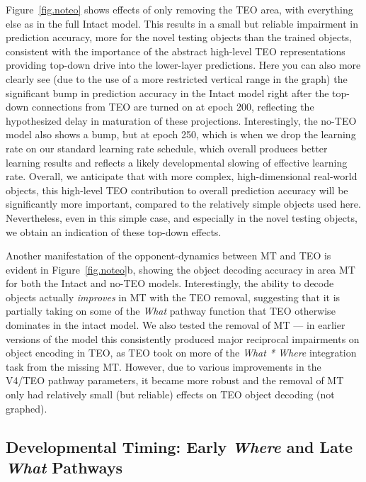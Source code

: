 \documentclass[11pt,twoside]{article}
\newif\myifpdf
\begin{document}
Figure~\ref{fig.noteo} shows effects of only removing the TEO area, with everything else as in the full Intact model.  This results in a small but reliable impairment in prediction accuracy, more for the novel testing objects than the trained objects, consistent with the importance of the abstract high-level TEO representations providing top-down drive into the lower-layer predictions.  Here you can also more clearly see (due to the use of a more restricted vertical range in the graph) the significant bump in prediction accuracy in the Intact model right after the top-down connections from TEO are turned on at epoch 200, reflecting the hypothesized delay in maturation of these projections.  Interestingly, the no-TEO model also shows a bump, but at epoch 250, which is when we drop the learning rate on our standard learning rate schedule, which overall produces better learning results and reflects a likely developmental slowing of effective learning rate.  Overall, we anticipate that with more complex, high-dimensional real-world objects, this high-level TEO contribution to overall prediction accuracy will be significantly more important, compared to the relatively simple objects used here.  Nevertheless, even in this simple case, and especially in the novel testing objects, we obtain an indication of these top-down effects.

Another manifestation of the opponent-dynamics between MT and TEO is evident in Figure~\ref{fig.noteo}b, showing the object decoding accuracy in area MT for both the Intact and no-TEO models.  Interestingly, the ability to decode objects actually {\em improves} in MT with the TEO removal, suggesting that it is partially taking on some of the {\em What} pathway function that TEO otherwise dominates in the intact model.   We also tested the removal of MT --- in earlier versions of the model this consistently produced major reciprocal impairments on object encoding in TEO, as TEO took on more of the {\em What * Where} integration task from the missing MT.  However, due to various improvements in the V4/TEO pathway parameters, it became more robust and the removal of MT only had relatively small (but reliable) effects on TEO object decoding (not graphed).

\subsection{Developmental Timing: Early {\em Where} and Late {\em What} Pathways}
\end{document}
